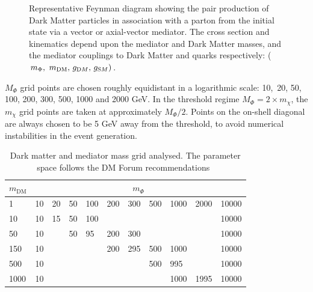 \begin{figure}[h!] \centering
{}
\caption{Representative Feynman diagram showing the pair production of Dark
Matter particles in association with a parton from the initial state via a
vector or axial-vector mediator. The cross section and kinematics depend upon
the mediator and Dark Matter masses, and the mediator couplings to Dark Matter
and quarks respectively: ($m_{\Phi} ,\ m_\textrm{DM} ,\, g_{\textrm DM} ,\,
g_{\textrm SM})$. \cite{Abercrombie:2015wmb}} \label{fig:feynman} \end{figure}

$M_{\Phi}$ grid points are chosen roughly equidistant in a logarithmic scale:
10,~20, 50, 100, 200, 300, 500, 1000 and 2000 GeV. In the threshold regime
$M_{\Phi} = 2 \times m_{\chi}$, the $ m_{\chi}$ grid points are taken at
approximately $M_{\Phi}/2$. Points on the on-shell diagonal are always chosen to
be 5 GeV away from the threshold, to avoid numerical instabilities in the event
generation. 


\begin{table}[h!] \centering \begin{tabular}{l|llllllllll}\hline \hline
$m_\textrm{DM}$  & \multicolumn{10}{c}{$m_\Phi$}
\\ \hline 1    & 10 & 20 & 50 & 100 & 200 & 300 & 500 & 1000 & 2000 & 10000 \\
10   & 10 & 15 & 50 & 100 &     &     &     &      &      & 10000 \\ 50   & 10 &
& 50 & 95  & 200 & 300 &     &      &      & 10000 \\ 150  & 10 &    &    &
& 200 & 295 & 500 & 1000 &      & 10000 \\ 500  & 10 &    &    &     &     &
& 500 & 995  &      & 10000 \\ 1000 & 10 &    &    &     &     &     &     &
1000 & 1995 & 10000\\ \hline \hline \end{tabular} \caption{Dark matter and
mediator mass grid analysed. The parameter space follows the DM Forum
recommendations~\cite{Abercrombie:2015wmb}} \label{tab:DMgrid} \end{table}

